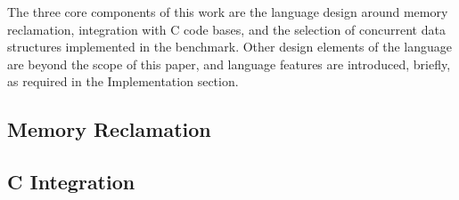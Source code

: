The three core components of this work are the language design around memory reclamation, integration with C code bases, and the selection of concurrent data structures implemented in the benchmark.  Other design elements of the language are beyond the scope of this paper, and language features are introduced, briefly, as required in the Implementation section.

\subsection{Memory Reclamation}



\subsection{C Integration}


